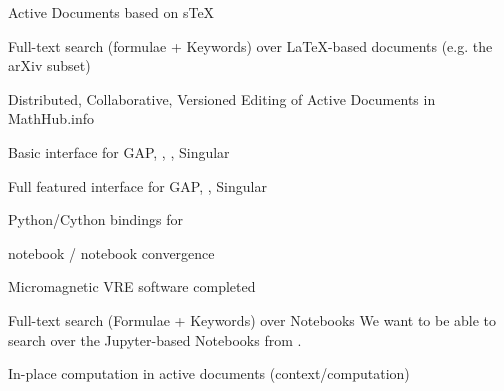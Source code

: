 \begin{workpackage}
\begin{wpdelivs}
  \begin{wpdeliv}[id=adstex,due=6,nature=R,dissem=PU,lead=JU]
    {Active Documents based on sTeX}
  \end{wpdeliv}
    \begin{wpdeliv}[id=mws,due=9,nature=OTHER,dissem=PU,lead=JU]
      {Full-text search (formulae + Keywords) over LaTeX-based documents
        (e.g. the arXiv subset)}
    \end{wpdeliv}
    \begin{wpdeliv}[id=mathhub-editing,due=12,nature=DEM,dissem=PU,lead=JU]
      {Distributed, Collaborative, Versioned Editing of Active Documents in MathHub.info}
    \end{wpdeliv}
  \begin{wpdeliv}[due=14,id=ipython-kernels-basic,dissem=PU,nature=OTHER,lead=PS]
      {Basic \Jupyter interface for GAP, \PariGP, \Sage, Singular}
  \end{wpdeliv}
  \begin{wpdeliv}[due=12,id=ipython-kernels,dissem=PU,nature=OTHER,lead=PS]
      {Full featured \Jupyter interface for GAP, \PariGP, Singular}
  \end{wpdeliv}
  \begin{wpdeliv}[due=24,id=pari-python-lib,dissem=PU,nature=OTHER,lead=UB]
	  {Python/Cython bindings for \PariGP}
  \end{wpdeliv}

  \begin{wpdeliv}[due=12,id=ipython-kernel-sage,dissem=PU,nature=DEM,lead=PS]
      {\Sage notebook / \Jupyter notebook convergence}
  \end{wpdeliv}
    \begin{wpdeliv}[due=15,id=oommf-nb,dissem=PU,nature=OTHER,lead=USO]
      {Micromagnetic VRE software completed}
    \end{wpdeliv}

    \begin{wpdeliv}[id=notebooksearch,due=18,nature=OTHER,dissem=PU,lead=JU]
      {Full-text search (Formulae + Keywords) over Notebooks}
      We want to be able to search over the Jupyter-based Notebooks from
      .
\end{wpdeliv}
    \begin{wpdeliv}[id=adcomp,due=18,nature=DEM,dissem=PU,lead=JU]
      {In-place computation in active documents (context/computation)}
    \end{wpdeliv}


\end{wpdelivs}
\end{workpackage}
